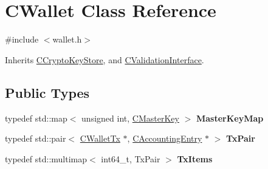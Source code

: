\hypertarget{class_c_wallet}{}\section{C\+Wallet Class Reference}
\label{class_c_wallet}


{\ttfamily \#include $<$wallet.\+h$>$}



Inherits \mbox{\hyperlink{class_c_crypto_key_store}{C\+Crypto\+Key\+Store}}, and \mbox{\hyperlink{class_c_validation_interface}{C\+Validation\+Interface}}.

\subsection*{Public Types}
\begin{DoxyCompactItemize}
\item 
\mbox{\label{class_c_wallet_a0e21167a320a0ab8f15d0e11c6749a0e}} 
typedef std\+::map$<$ unsigned int, \mbox{\hyperlink{class_c_master_key}{C\+Master\+Key}} $>$ {\bfseries Master\+Key\+Map}
\item 
\mbox{\label{class_c_wallet_ad1557a7d200f70bc97319376a24c98a7}} 
typedef std\+::pair$<$ \mbox{\hyperlink{class_c_wallet_tx}{C\+Wallet\+Tx}} $\ast$, \mbox{\hyperlink{class_c_accounting_entry}{C\+Accounting\+Entry}} $\ast$ $>$ {\bfseries Tx\+Pair}
\item 
\mbox{\label{class_c_wallet_a03b42ca49a478ae8089e096d498d1dfe}} 
typedef std\+::multimap$<$ int64\+\_\+t, Tx\+Pair $>$ {\bfseries Tx\+Items}
\end{DoxyCompactItemize}
